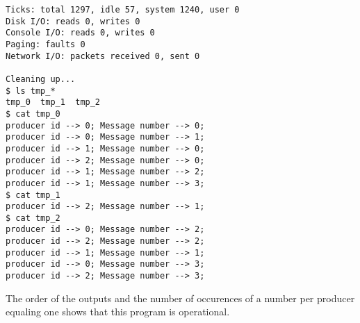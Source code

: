 \documentclass[11pt]{article}
\begin{document}
\begin{question}
\begin{verbatim}
Ticks: total 1297, idle 57, system 1240, user 0
Disk I/O: reads 0, writes 0
Console I/O: reads 0, writes 0
Paging: faults 0
Network I/O: packets received 0, sent 0

Cleaning up...
$ ls tmp_*
tmp_0  tmp_1  tmp_2
$ cat tmp_0
producer id --> 0; Message number --> 0;
producer id --> 0; Message number --> 1;
producer id --> 1; Message number --> 0;
producer id --> 2; Message number --> 0;
producer id --> 1; Message number --> 2;
producer id --> 1; Message number --> 3;
$ cat tmp_1
producer id --> 2; Message number --> 1;
$ cat tmp_2
producer id --> 0; Message number --> 2;
producer id --> 2; Message number --> 2;
producer id --> 1; Message number --> 1;
producer id --> 0; Message number --> 3;
producer id --> 2; Message number --> 3;
    \end{verbatim}

    The order of the outputs and the number of occurences of a number per producer equaling one shows that this program is operational.

\end{question}
\end{document}
